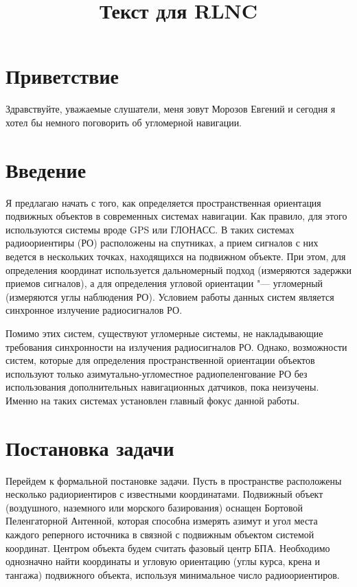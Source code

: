 \documentclass[a4paper, 14pt]{extarticle}
\title{Текст для RLNC}
\date{}
\begin{document}
\maketitle

\section{Приветствие}
Здравствуйте, уважаемые слушатели, меня зовут Морозов Евгений и сегодня
я хотел бы немного поговорить об угломерной навигации.

\section{Введение}
Я предлагаю начать с того, как определяется пространственная ориентация подвижных
объектов в современных системах навигации. Как правило, для этого используются системы
вроде GPS или ГЛОНАСС. В таких системах радиоориентиры (РО) расположены на спутниках,
а прием сигналов с них ведется в нескольких точках, находящихся на подвижном объекте.
При этом, для определения координат используется дальномерный подход (измеряются задержки приемов сигналов),
а для определения угловой ориентации "--- угломерный (измеряются углы наблюдения РО).
Условием работы данных систем является синхронное излучение радиосигналов РО.

Помимо этих систем, существуют угломерные системы, не накладывающие требования синхронности
на излучения радиосигналов РО. Однако, возможности систем, которые для определения пространственной
ориентации объектов используют только азимутально-угломестное радиопеленгование РО без
использования дополнительных навигационных датчиков, пока неизучены. Именно на таких
системах установлен главный фокус данной работы.

\section{Постановка задачи}
Перейдем к формальной постановке задачи. Пусть в пространстве расположены несколько
радиориентиров с известными координатами. Подвижный объект (воздушного, наземного или
морского базирования) оснащен Бортовой Пеленгаторной Антенной, которая способна измерять
азимут и угол места каждого реперного источника в связной с подвижным объектом системой
координат. Центром объекта будем считать фазовый центр БПА. Необходимо однозначно найти
координаты и угловую ориентацию (углы курса, крена и тангажа) подвижного объекта, используя
минимальное число радиоориентиров.
\end{document}
